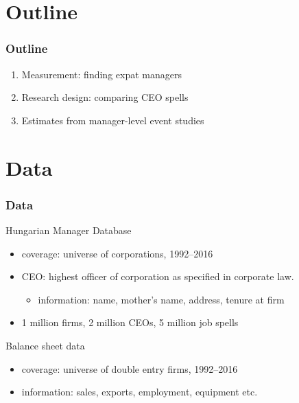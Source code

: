 \documentclass[aspectratio=43,compress,mathserif]{beamer}
\newcounter{ora}
\begin{document}
\section{Outline}\hypertarget{Outline}{}
\begin{frame}\frametitle{Outline}\hypertarget{Outline}{}
\begin{enumerate}\setcounter{enumi}{0}
\item Measurement: finding expat managers

\item Research design: comparing CEO spells

\item Estimates from manager-level event studies


\end{enumerate}
\end{frame}







\section{Data}\hypertarget{Data}{}


\begin{frame}\frametitle{Data}\hypertarget{Data}{}
\begin{block}{Hungarian Manager Database}\hypertarget{Hungarian Manager Database}{}
\begin{itemize}
\item coverage: universe of corporations, 1992--2016

\item CEO: highest officer of corporation as specified in corporate law.
\begin{itemize}
\item information: name, mother's name, address, tenure at firm
\end{itemize}

\item 1 million firms, 2 million CEOs, 5 million job spells


\end{itemize}
\end{block}
\begin{block}{Balance sheet data}\hypertarget{Balance sheet data}{}
\begin{itemize}
\item coverage: universe of double entry firms, 1992--2016

\item information: sales, exports, employment, equipment etc.


\end{itemize}
\end{block}
\end{frame}
\end{document}
